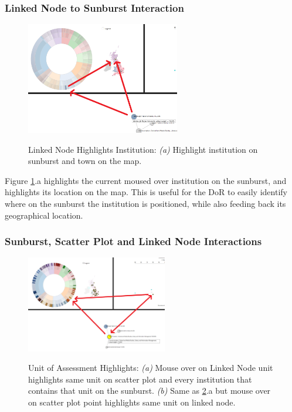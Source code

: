 \documentclass[a4paper, 11pt]{article}
\begin{document}
\subsubsection{Linked Node to Sunburst Interaction}
\begin{figure}[hbt!]
	\centering
      \includegraphics[width=0.6\textwidth]{imgs/sb_ln_int/LN_SB_Institute_map_highlight.png} \\
	\caption{Linked Node Highlights Institution: 
	\textit{(a)} Highlight institution on sunburst and town on the map.}
    \label{fig:ln_sb_int:institution_town_highlight}
     \noindent\makebox[\linewidth]{\rule{\textwidth}{0.4pt}}
\end{figure}

\noindent Figure \ref{fig:ln_sb_int:institution_town_highlight}.a highlights the current moused over institution on the sunburst, and highlights its location on the map. This is useful for the DoR to easily identify where on the sunburst the institution is positioned, while also feeding back its geographical location.


\subsubsection{Sunburst, Scatter Plot and Linked Node Interactions}
\begin{figure}[hbt!]
	\centering
      \includegraphics[width=0.55\textwidth]{imgs/sb_sc_ln_int/3_way_topic_highlight.png} \\
	\caption{Unit of Assessment Highlights: 
	\textit{(a)} Mouse over on Linked Node unit highlights same unit on scatter plot and every institution that contains that unit on the sunburst.
	\textit{(b)} Same as \ref{fig:sb_sc_ln_int:3_way_topic_highlight}.a but mouse over on scatter plot point highlights same unit on linked node.}
    \label{fig:sb_sc_ln_int:3_way_topic_highlight}
     \noindent\makebox[\linewidth]{\rule{\textwidth}{0.4pt}}
\end{figure}
\end{document}
